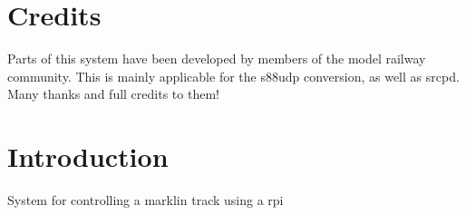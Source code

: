 \section*{Credits}
Parts of this system have been developed by members of the model railway community. This is mainly applicable for the s88udp conversion, as well as srcpd. Many thanks and full credits to them!

\newpage

\section{Introduction}
System for controlling a marklin track using a rpi